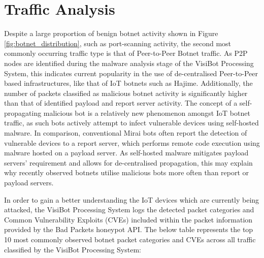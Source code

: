 \section{Traffic Analysis}

Despite a large proportion of benign botnet activity shown in Figure \ref{fig:botnet_distribution}, such as port-scanning activity, the second most commonly occurring traffic type is that of Peer-to-Peer Botnet traffic. As P2P nodes are identified during the malware analysis stage of the VisiBot Processing System, this indicates current popularity in the use of de-centralised Peer-to-Peer based infrastructures, like that of IoT botnets such as Hajime. Additionally, the number of packets classified as malicious botnet activity is significantly higher than that of identified payload and report server activity. The concept of a self-propagating malicious bot is a relatively new phenomenon amongst IoT botnet traffic, as such bots actively attempt to infect vulnerable devices using self-hosted malware. In comparison, conventional Mirai bots often report the detection of vulnerable devices to a report server, which performs remote code execution using malware hosted on a payload server. As self-hosted malware mitigates payload servers' requirement and allows for de-centralised propagation, this may explain why recently observed botnets utilise malicious bots more often than report or payload servers. 

In order to gain a better understanding the IoT devices which are currently being attacked, the VisiBot Processing System logs the detected packet categories and Common Vulnerability Exploits (CVEs) included within the packet information provided by the Bad Packets honeypot API. \citep{BadPackets} The below table represents the top 10 most commonly observed botnet packet categories and CVEs across all traffic classified by the VisiBot Processing System:

